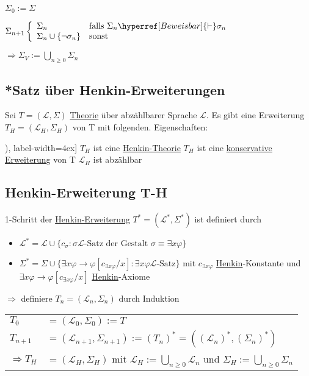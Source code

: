 \documentclass[12pt,a4paper]{article} %
\begin{document}
	$\Sigma_0 := \Sigma$
	
	$\Sigma_{n + 1} \left\lbrace 
		\begin{array}{l l}
			\Sigma_n & \text{falls } \Sigma_n \hyperref[Beweisbar]{\vdash} \sigma_n \\
			\Sigma_n \cup \{\neg \sigma_n\} & \text{sonst}
		\end{array}
	\right.$
	
	$\Rightarrow \Sigma_V := \bigcup\limits_{n \ge 0} \Sigma_n$
	
	\subsection{*Satz über Henkin-Erweiterungen}
	\label{HenkinErweiterung}
	Sei $T = (\mathcal{L}, \Sigma)$ \hyperref[Theorie]{Theorie} über abzählbarer Sprache $\mathcal{L}$. Es gibt eine Erweiterung $T_H = (\mathcal{L}_H, \Sigma_H)$ von T mit folgenden. \newline 
	Eigenschaften:
	
	\begin{tasks}[counter-format=(tsk[r]), label-width=4ex]
		\task $T_H$ ist eine \hyperref[Henkin]{Henkin-Theorie}
		\task $T_H$ ist eine \hyperref[Erweiterung]{konservative Erweiterung} von T
		\task $\mathcal{L}_H$ ist abzählbar
	\end{tasks}

	\subsection{Henkin-Erweiterung T-H}
	1-Schritt der \hyperref[HenkinErweiterung]{Henkin-Erweiterung} $T^* = (\mathcal{L}^*, \Sigma^*)$ ist definiert durch
	\begin{itemize}
		\item $\mathcal{L}^* = \mathcal{L} \cup \{c_{\sigma} : \sigma \hyperref[LSatz]{\mathcal{L} \text{-Satz}} \text{ der Gestalt } \sigma \equiv \exists x  \varphi\}$
		\item $\Sigma^* = \Sigma \cup \{\exists x \varphi \rightarrow \varphi[c_{\exists x \varphi}/x] : \exists x \varphi \hyperref[LSatz]{\mathcal{L} \text{-Satz}}\}$ mit $c_{\exists x \varphi}$ \hyperref[Henkin]{Henkin}-Konstante und $\exists x \varphi \rightarrow \varphi[c_{\exists x \varphi}/x]$ \hyperref[Henkin]{Henkin}-Axiome 
	\end{itemize}
	$\Rightarrow$ definiere $T_n = (\mathcal{L}_n, \Sigma_n)$ durch Induktion \newline
	\begin{tabular}{l l}
		$T_0$ & $= (\mathcal{L}_0, \Sigma_0) := T$ \\
		$T_{n + 1}$ & $= (\mathcal{L}_{n + 1}, \Sigma_{n + 1}) := (T_n)^* = ((\mathcal{L}_n)^*, (\Sigma_n)^*)$ \\
		$\Rightarrow T_H$ & $= (\mathcal{L}_H, \Sigma_H)$ mit $\mathcal{L}_H := \bigcup\limits_{n \ge 0} \mathcal{L}_n$ und $\Sigma_H := \bigcup\limits_{n \ge 0} \Sigma_n$
	\end{tabular}
	
\end{document}
